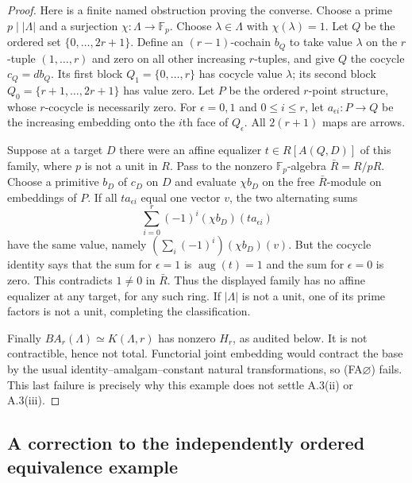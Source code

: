 \begin{proof}
Here is a finite named obstruction proving the converse. Choose a
prime $p\mid|\Lambda|$ and a surjection $\chi:\Lambda\to\mathbb F_p$.
Choose $\lambda\in\Lambda$ with $\chi(\lambda)=1$. Let $Q$ be the
ordered set $\{0,\ldots,2r+1\}$. Define an $(r-1)$-cochain $b_Q$
to take value $\lambda$ on the $r$-tuple $(1,\ldots,r)$ and zero
on all other increasing $r$-tuples, and give $Q$ the cocycle
$c_Q=db_Q$. Its first block $Q_1=\{0,\ldots,r\}$ has cocycle
value $\lambda$; its second block
$Q_0=\{r+1,\ldots,2r+1\}$ has value zero.
Let $P$ be the ordered $r$-point structure, whose $r$-cocycle is
necessarily zero. For $\epsilon=0,1$ and $0\leq i\leq r$, let
$a_{\epsilon i}:P\to Q$ be the increasing embedding onto the
$i$th face of $Q_\epsilon$. All $2(r+1)$ maps are arrows.

Suppose at a target $D$ there were an affine equalizer
$t\in R[A(Q,D)]$ of this family, where $p$ is not a unit in $R$.
Pass to the nonzero $\mathbb F_p$-algebra $\bar R=R/pR$.
Choose a primitive $b_D$ of $c_D$ on $D$ and evaluate
$\chi b_D$ on the free $\bar R$-module on embeddings of $P$.
If all $t a_{\epsilon i}$ equal one vector $v$, the two alternating
sums
\[
 \sum_{i=0}^r(-1)^i(\chi b_D)(t a_{\epsilon i})
\]
have the same value, namely
$(\sum_i(-1)^i)(\chi b_D)(v)$. But the cocycle identity says that
the sum for $\epsilon=1$ is $\operatorname{aug}(t)=1$ and the
sum for $\epsilon=0$ is zero. This contradicts $1\ne0$ in
$\bar R$. Thus the displayed family has no affine equalizer at
any target, for any such ring. If $|\Lambda|$ is not a unit, one
of its prime factors is not a unit, completing the classification.

Finally $BA_r(\Lambda)\simeq K(\Lambda,r)$ has nonzero $H_r$,
as audited below. It is not contractible, hence not total.
Functorial joint embedding would contract the base by the usual
identity--amalgam--constant natural transformations, so
(FA$\varnothing$) fails. This last failure is precisely why this
example does not settle A.3(ii) or A.3(iii).
\end{proof}

\subsection{A correction to the independently ordered equivalence example}

